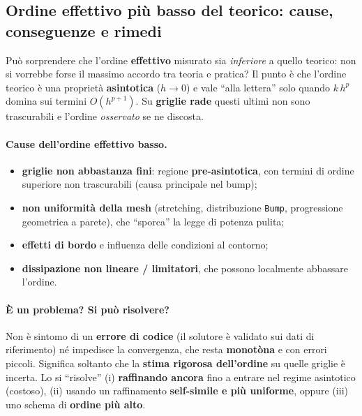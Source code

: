\subsection{Ordine effettivo più basso del teorico: cause, conseguenze e rimedi}
\label{subsec:ordine_basso}

Può sorprendere che l'ordine \textbf{effettivo} misurato sia \emph{inferiore} a quello teorico: non
si vorrebbe forse il massimo accordo tra teoria e pratica? Il punto è che l'ordine teorico è una
proprietà \textbf{asintotica} ($h\to0$) e vale ``alla lettera'' solo quando $k\,h^p$ domina sui
termini $O(h^{p+1})$. Su \textbf{griglie rade} questi ultimi non sono trascurabili e l'ordine
\emph{osservato} se ne discosta.

\paragraph{Cause dell'ordine effettivo basso.}
\begin{itemize}
  \item \textbf{griglie non abbastanza fini}: regione \textbf{pre-asintotica}, con termini di ordine
    superiore non trascurabili (causa principale nel bump);
  \item \textbf{non uniformità della mesh} (stretching, distribuzione \texttt{Bump}, progressione
    geometrica a parete), che ``sporca'' la legge di potenza pulita;
  \item \textbf{effetti di bordo} e influenza delle condizioni al contorno;
  \item \textbf{dissipazione non lineare / limitatori}, che possono localmente abbassare l'ordine.
\end{itemize}

\paragraph{È un problema? Si può risolvere?} Non è sintomo di un \textbf{errore di codice} (il
solutore è validato sui dati di riferimento) né impedisce la convergenza, che resta \textbf{monotòna}
e con errori piccoli. Significa soltanto che la \textbf{stima rigorosa dell'ordine} su quelle griglie
è incerta. Lo si ``risolve'' (i) \textbf{raffinando ancora} fino a entrare nel regime asintotico
(costoso), (ii) usando un raffinamento \textbf{self-simile e più uniforme}, oppure (iii) uno schema
di \textbf{ordine più alto}.

